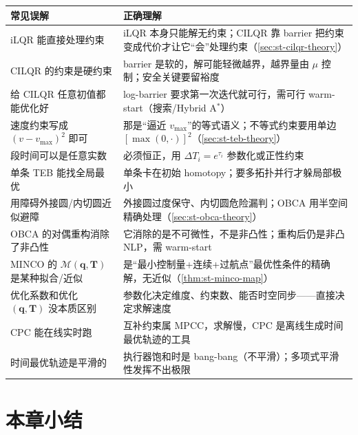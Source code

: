 \begin{table}[H]\centering\small
\begin{tabular}{p{} p{}}
\toprule
\textbf{常见误解} & \textbf{正确理解} \\
\midrule
iLQR 能直接处理约束 & iLQR 本身只能解无约束；CILQR 靠 barrier 把约束变成代价才让它“会”处理约束（\cref{sec:st-cilqr-theory}） \\
CILQR 的约束是硬约束 & barrier 是软的，解可能轻微越界，越界量由 $\mu$ 控制；安全关键要留裕度 \\
给 CILQR 任意初值都能优化好 & log-barrier 要求第一次迭代就可行，需可行 warm-start（搜索/Hybrid A$^*$） \\
速度约束写成 $(v-v_{\max})^2$ 即可 & 那是“逼近 $v_{\max}$”的等式语义；不等式约束要用单边 $[\max(0,\cdot)]^2$（\cref{sec:st-teb-theory}） \\
段时间可以是任意实数 & 必须恒正，用 $\Delta T_i=e^{\tau_i}$ 参数化或正性约束 \\
单条 TEB 能找全局最优 & 单条卡在初始 homotopy；要多拓扑并行才躲局部极小 \\
用障碍外接圆/内切圆近似避障 & 外接圆过度保守、内切圆危险漏判；OBCA 用半空间精确处理（\cref{sec:st-obca-theory}） \\
OBCA 的对偶重构消除了非凸性 & 它消除的是不可微性，不是非凸性；重构后仍是非凸 NLP，需 warm-start \\
MINCO 的 $\mathcal M(\mathbf q,\mathbf T)$ 是某种拟合/近似 & 是“最小控制量+连续+过航点”最优性条件的精确解，无近似（\cref{thm:st-minco-map}） \\
优化系数和优化 $(\mathbf q,\mathbf T)$ 没本质区别 & 参数化决定维度、约束数、能否时空同步——直接决定求解速度 \\
CPC 能在线实时跑 & 互补约束属 MPCC，求解慢，CPC 是离线生成时间最优轨迹的工具 \\
时间最优轨迹是平滑的 & 执行器饱和时是 bang-bang（不平滑）；多项式平滑性发挥不出极限 \\
\bottomrule
\end{tabular}
\end{table}

\section*{本章小结}

